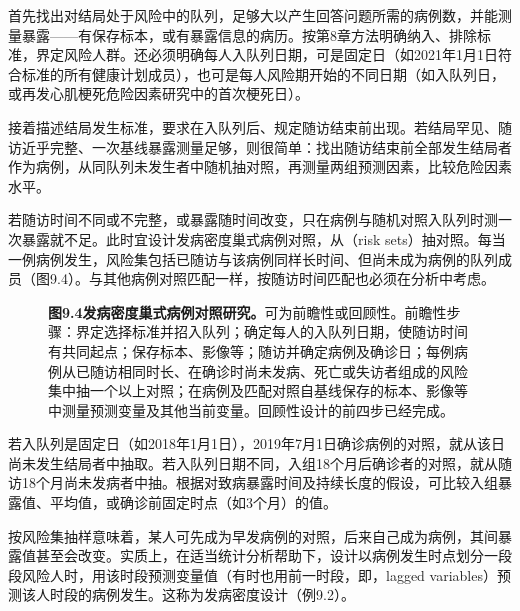 首先找出对结局处于风险中的队列，足够大以产生回答问题所需的病例数，并能测量暴露——有保存标本，或有暴露信息的病历。按第8章方法明确纳入、排除标准，界定风险人群。还必须明确每人入队列日期，可是固定日（如2021年1月1日符合标准的所有健康计划成员），也可是每人风险期开始的不同日期（如入队列日，或再发心肌梗死危险因素研究中的首次梗死日）。

接着描述结局发生标准，要求在入队列后、规定随访结束前出现。若结局罕见、随访近乎完整、一次基线暴露测量足够，则很简单：找出随访结束前全部发生结局者作为病例，从同队列未发生者中随机抽对照，再测量两组预测因素，比较危险因素水平。

若随访时间不同或不完整，或暴露随时间改变，只在病例与随机对照入队列时测一次暴露就不足。此时宜设计发病密度巢式病例对照，从（risk sets）抽对照。每当一例病例发生，风险集包括已随访与该病例同样长时间、但尚未成为病例的队列成员（图9.4）。与其他病例对照匹配一样，按随访时间匹配也必须在分析中考虑。
\begin{figure}[htbp]\centering\chNineRiskSets
\caption*{\textbf{图9.4\quad 发病密度巢式病例对照研究。}可为前瞻性或回顾性。前瞻性步骤：界定选择标准并招入队列；确定每人的入队列日期，使随访时间有共同起点；保存标本、影像等；随访并确定病例及确诊日；每例病例从已随访相同时长、在确诊时尚未发病、死亡或失访者组成的风险集中抽一个以上对照；在病例及匹配对照自基线保存的标本、影像等中测量预测变量及其他当前变量。回顾性设计的前四步已经完成。}
\end{figure}

若入队列是固定日（如2018年1月1日），2019年7月1日确诊病例的对照，就从该日尚未发生结局者中抽取。若入队列日期不同，入组18个月后确诊者的对照，就从随访18个月尚未发病者中抽。根据对致病暴露时间及持续长度的假设，可比较入组暴露值、平均值，或确诊前固定时点（如3个月）的值。

按风险集抽样意味着，某人可先成为早发病例的对照，后来自己成为病例，其间暴露值甚至会改变。实质上，在适当统计分析帮助下，设计以病例发生时点划分一段段风险人时，用该时段预测变量值（有时也用前一时段，即，lagged variables）预测该人时段的病例发生。这称为发病密度设计（例9.2）。

